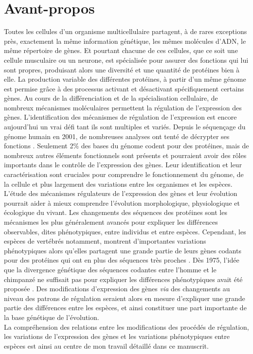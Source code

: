 \chapter*{Avant-propos}

Toutes les cellules d’un organisme multicellulaire partagent, à de rares exceptions près, exactement la même information génétique, les mêmes molécules d’ADN, le même répertoire de gènes. Et pourtant chacune de ces cellules, que ce soit une cellule musculaire ou un neurone, est spécialisée pour assurer des fonctions qui lui sont propres, produisant alors une diversité et une quantité de protéines bien à elle. La production variable des différentes protéines, à partir d’un même génome est permise grâce à des processus activant et désactivant spécifiquement certains gènes. Au cours de la différenciation et de la spécialisation cellulaire, de nombreux mécanismes moléculaires permettent la régulation de l’expression des gènes. L’identification des mécanismes de régulation de l’expression est encore aujourd’hui un vrai défi tant ils sont multiples et variés. Depuis le séquençage du génome humain en 2001, de nombreuses analyses ont tenté de décrypter ses fonctions \citep{venter_sequence_2001}. Seulement 2\% des bases du génome codent pour des protéines, mais de nombreux autres éléments fonctionnels sont présents et pourraient avoir des rôles importants dans le contrôle de l'expression des gènes. Leur identification et leur caractérisation sont cruciales pour comprendre le fonctionnement du génome, de la cellule et plus largement des variations entre les organismes et les espèces. \\

L'étude des mécanismes régulateurs de l’expression des gènes et leur évolution pourrait aider à mieux comprendre l’évolution morphologique, physiologique et écologique du vivant. Les changements des séquences des protéines sont les mécanismes les plus généralement avancés pour expliquer les différences observables, dites phénotypiques, entre individus et entre espèces. Cependant, les espèces de vertébrés notamment, montrent d’importantes variations phénotypiques alors qu’elles partagent une grande partie de leurs gènes codants pour des protéines qui ont en plus des séquences très proches \citep{ponting_functional_2008}. Dès 1975, l’idée que la divergence génétique des séquences codantes entre l’homme et le chimpanzé ne suffisait pas pour expliquer les différences phénotypiques avait été proposée \citep{king_evolution_1975}. Des modifications d’expression des gènes \textit{via} des changements au niveau des patrons de régulation seraient alors en mesure d’expliquer une grande partie des différences entre les espèces, et ainsi constituer une part importante de la base génétique de l’évolution. \\

La compréhension des relations entre les modifications des procédés de régulation, les variations de l’expression des gènes et les variations phénotypiques entre espèces est ainsi au centre de mon travail détaillé dans ce manuscrit. 
